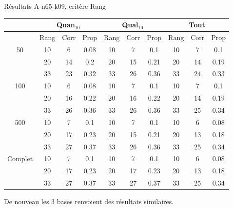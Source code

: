 \documentclass{beamer}
\begin{document}
\begin{frame}{Résultats A-n65-k09, critère Rang}
\begin{table}[H]

\begin{tabular}{|@{}c@{}|@{}c@{}|@{}c@{}|@{}c@{}||@{}c@{}|@{}c@{}|@{}c@{}||@{}c@{}|@{}c@{}|@{}c@{}|}

\hline
 & \multicolumn{3}{c|}{Quan$_{10}$} & \multicolumn{3}{c|}{Qual$_{10}$} & \multicolumn{3}{c|}{Tout} \\
 \hline
 & Rang & Corr & Prop & Rang & Corr & Prop & Rang & Corr & Prop \\
 \hline
 50 & 10  & 6 & 0.08 & 10  & 7 & 0.1 & 10  & 7 & 0.1  \\
 \cline{2-10} 
    & 20 & 14 & 0.2 & 20  & 15 & 0.21 & 20  & 14 & 0.19  \\
 \cline{2-10} 
    & 33 & 23 & 0.32 & 33 & 26 & 0.36 & 33 & 24 & 0.33  \\
  \hline
   100 & 10  & 6 & 0.08 & 10  & 7 & 0.1 & 10  & 7 & 0.1  \\
 \cline{2-10} 
    & 20 & 16 & 0.22 & 20 & 16 & 0.22 & 20 & 14 & 0.19  \\
  \cline{2-10} 
    & 33 & 26 & 0.36 & 33 & 26 & 0.36 & 33 & 25 & 0.34  \\
  \hline
   500 & 10  & 7 & 0.1 & 10  & 7 & 0.1 & 10  & 6 & 0.08  \\
 \cline{2-10} 
    & 20 & 17 & 0.23 & 20 & 15 & 0.21 & 20 & 13 & 0.18  \\
  \cline{2-10} 
    & 33 & 27 & 0.37 & 33 & 26 & 0.36 & 33 & 25 & 0.34  \\
  \hline
   Complet & 10 & 7 & 0.1 & 10 & 7 & 0.1 & 10 & 6 & 0.08  \\
 \cline{2-10} 
    & 20 & 17 & 0.23 & 20 & 17 & 0.23 & 20 & 13 & 0.18  \\
  \cline{2-10} 
    & 33 & 27 & 0.37 & 33 & 27 & 0.37 & 33 & 25 & 0.34  \\
  \hline

\end{tabular}
\end{table}

De nouveau les 3 bases renvoient des résultats similaires. 
\end{frame}
\end{document}
